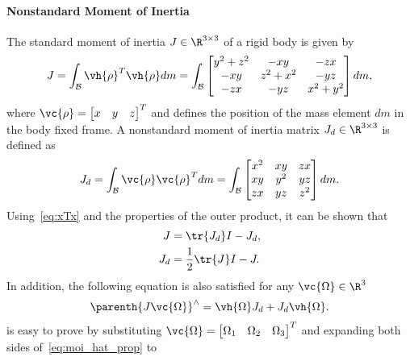 \paragraph{Nonstandard Moment of Inertia}\label{sec:nonstandard_moi}
The standard moment of inertia \( J \in \R^{3 \times 3} \) of a rigid body is given by
\begin{align}\label{eq:standard_moment_of_inertia}
    J = \int_{\mathcal{B}} \vh{\rho}^T \vh{\rho} dm 
    = \int_{\mathcal{B}}  
    \begin{bmatrix} 
        y^2 + z^2 & -xy & -zx \\
        -xy & z^2 + x^2 & -yz \\
        -zx & -yz & x^2 + y^2
    \end{bmatrix} dm, 
\end{align}
where \( \vc{\rho} = \begin{bmatrix} x & y & z \end{bmatrix}^T\) and defines the position of the mass element \( dm \) in the body fixed frame.
A nonstandard moment of inertia matrix \( J_d \in \R^{3 \times 3 } \) is defined as
\begin{align} \label{eq:nonstandard_moment_of_inertia}
    J_d = \int_{\mathcal{B}} \vc{\rho} \vc{\rho}^T dm = \int_{\mathcal{B}} 
    \begin{bmatrix}
        x^2 & xy & zx \\
        xy & y^2 & yz \\
        zx & yz & z^2
    \end{bmatrix} dm.
\end{align}
Using~\cref{eq:xTx} and the properties of the outer product, it can be shown that
\begin{subequations}\label{eq:moi_transformation}
    \begin{align}
        J &= \tr{J_d} I - J_d, \label{eq:moi_ns2s}\\
        J_d &= \frac{1}{2} \tr{J} I - J.\label{eq:moi_s2ns}
    \end{align}
\end{subequations}     
In addition, the following equation is also satisfied for any \( \vc{\Omega} \in \R^3 \)
\begin{align}\label{eq:moi_hat_prop}
    \parenth{J \vc{\Omega}}^\wedge = \vh{\Omega} J_d + J_d \vh{\Omega}.
\end{align}
 is easy to prove by substituting \( \vc{\Omega} = \begin{bmatrix} \Omega_1 & \Omega_2 & \Omega_3 \end{bmatrix}^T \) and expanding both sides of~\cref{eq:moi_hat_prop} to
